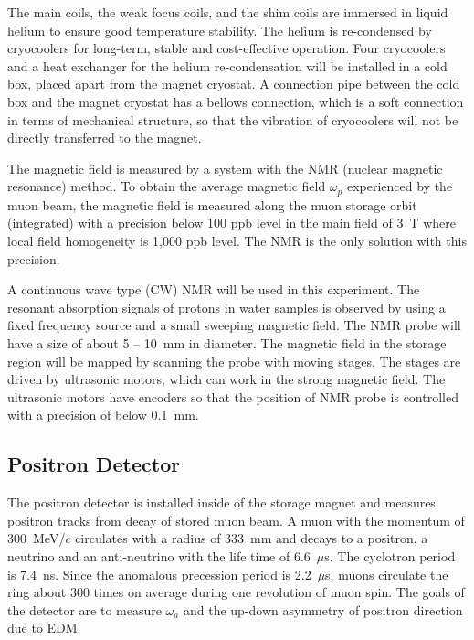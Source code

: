 The main coils, the weak focus coils, and the shim coils are immersed in liquid helium to ensure good temperature stability.
The helium is re-condensed by cryocoolers for long-term, stable and cost-effective operation.
Four cryocoolers and a heat exchanger for the helium re-condensation will be installed in a cold box,
 placed apart from the magnet cryostat.
A connection pipe between the cold box and the magnet cryostat has a bellows connection,
which is a soft connection in terms of mechanical structure, so that
the vibration of cryocoolers will not be directly transferred to the magnet.

The magnetic field is measured by a system with the NMR (nuclear magnetic resonance) method.
To obtain the average magnetic field $\omega_{p}$ experienced by the muon beam,
the magnetic field is measured along the muon storage orbit (integrated) with a precision below 100 ppb level
in the main field of 3~T where local field homogeneity is 1,000 ppb level.
The NMR is the only solution with this precision.

A continuous wave type (CW) NMR will be used in this experiment. 
The resonant absorption signals of protons in water samples is observed
by using a fixed frequency source and a small sweeping magnetic field.
The NMR probe will have a size of about 5 -- 10~mm in diameter.
The magnetic field in the storage region will be mapped by scanning the probe with moving stages.
The stages are driven by ultrasonic motors, which can work in the strong magnetic field.
The ultrasonic motors have encoders so that the position of NMR probe is controlled
with a precision of below 0.1~mm.

\subsection{Positron Detector}\label{sec:detector}

The positron detector is installed inside of the storage magnet
and measures positron tracks from decay of stored muon beam.
A muon with the momentum of 300~MeV/$c$ circulates with a radius
of 333~mm and decays to a positron, a neutrino and an anti-neutrino
with the life time of 6.6~$\mu$s. The cyclotron period is 7.4~ns.
Since the anomalous precession period is 2.2~$\mu$s, muons circulate
the ring about 300 times on average during one revolution of muon spin.
The goals of the detector are to measure $\omega_{a}$
and the up-down asymmetry of positron direction due to EDM.

